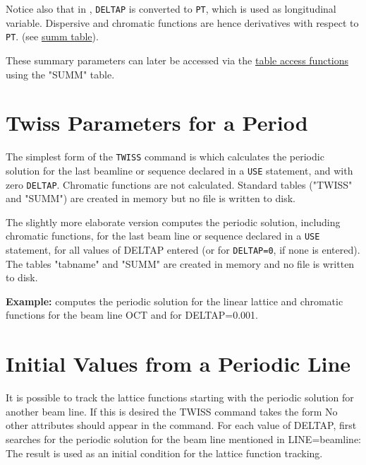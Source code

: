 Notice also that in \madx, \texttt{DELTAP} is converted to \texttt{PT},
which is used as longitudinal variable. 
Dispersive and chromatic functions are hence derivatives with
respect to \texttt{PT}. (see \hyperref[subsec:tables-summ]{summ table}). 

These summary parameters can later be accessed via the 
\hyperref[chap:tables]{table access functions} using the "SUMM" table.  

\section{Twiss Parameters for a Period}
\label{sec:twissperiod}

The simplest form of the \texttt{TWISS} command is
which calculates the periodic solution for the last beamline or sequence
declared in a \texttt{USE} statement, and with zero \texttt{DELTAP}.
Chromatic functions are not calculated. 
Standard tables ("TWISS" and "SUMM") are created in memory but no file
is written to disk. 

The slightly more elaborate version 
computes the periodic solution, including chromatic functions, for the last beam
line or sequence declared in a \texttt{USE} statement, for all values of
DELTAP entered (or for \texttt{DELTAP=0}, if none is entered). 
The tables "tabname" and "SUMM" are created in memory and no file is
written to disk. 

\textbf{Example:} 
computes the periodic solution for the linear lattice and
chromatic functions for the beam line OCT and for DELTAP=0.001. 


\section{Initial Values from a Periodic Line}
\label{sec:twissinitial}

It is possible to track the lattice functions starting with the periodic
solution for another beam line. If this is desired the TWISS command
takes the form  
No other attributes should appear in the command. For each value of
DELTAP, \madx first searches for the periodic solution for the beam line
mentioned in LINE=beamline: The result is used as an initial condition
for the lattice function tracking. 

